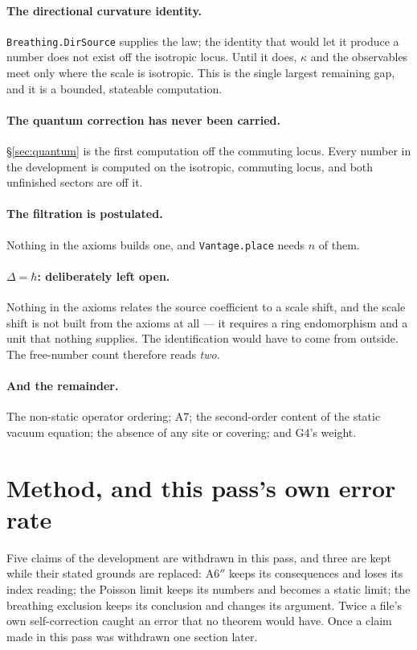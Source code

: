\documentclass[11pt,a4paper]{article}
\theoremstyle{definition}
\theoremstyle{remark}
\newcommand{\lean}[1]{\texttt{\small #1}}
\newcommand{\App}{\ensuremath{\mathrm{A6}''}}
\begin{document}
\paragraph{The directional curvature identity.} \lean{Breathing.DirSource} supplies
the law; the identity that would let it produce a number does not exist off the
isotropic locus. Until it does, $\kappa$ and the observables meet only where the
scale is isotropic. This is the single largest remaining gap, and it is a bounded,
stateable computation.

\paragraph{The quantum correction has never been carried.} \S\ref{sec:quantum} is
the first computation off the commuting locus. Every number in the development is
computed on the isotropic, commuting locus, and both unfinished sectors are off it.

\paragraph{The filtration is postulated.} Nothing in the axioms builds one, and
\lean{Vantage.place} needs $n$ of them.

\paragraph{\texorpdfstring{$\Delta=\hbar$}{Delta = hbar}: deliberately left open.}
Nothing in the axioms relates the source coefficient to a scale shift, and the
scale shift is not built from the axioms at all --- it requires a ring endomorphism
and a unit that nothing supplies. The identification would have to come from
outside. The free-number count therefore reads \emph{two}.

\paragraph{And the remainder.} The non-static operator ordering; A7; the
second-order content of the static vacuum equation; the absence of any site or
covering; and G4's weight.

\section{Method, and this pass's own error rate}
\label{sec:method}

Five claims of the development are withdrawn in this pass, and three are kept while
their stated grounds are replaced: \App{} keeps its consequences and loses its
index reading; the Poisson limit keeps its numbers and becomes a static limit; the
breathing exclusion keeps its conclusion and changes its argument. Twice a file's
own self-correction caught an error that no theorem would have. Once a claim made
in this pass was withdrawn one section later.
\end{document}
